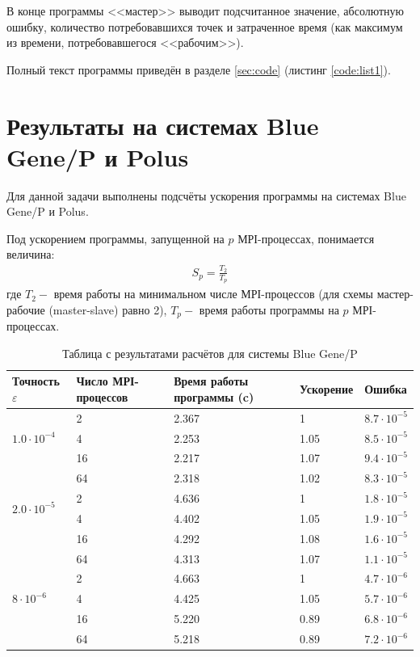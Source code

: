 \documentclass[12pt, fleqn]{article}
\theoremstyle{definition}
\begin{document}
В конце программы <<мастер>> выводит подсчитанное значение, абсолютную ошибку, количество  потребовавшихся точек и затраченное время (как максимум из времени, потребовавшегося <<рабочим>>).

Полный текст программы приведён в разделе \ref{sec:code} (листинг \ref{code:list1}).

\section{Результаты на системах Blue Gene/P и Polus}
Для данной задачи выполнены подсчёты ускорения программы на системах Blue Gene/P и Polus.

Под ускорением программы, запущенной на $p$ МРІ-процессах, понимается величина:
\abovedisplayskip=-1pt
\belowdisplayskip=-1pt
\noindent
\begin{gather*}
S_{p}=\frac{T_{2}}{T_{p}}
\end{gather*}
где $T_{2}-$ время работы на минимальном числе МРІ-процессов (для схемы мастер-рабочие (master-slave) равно 2), $T_{p}-$ время работы программы на $p$ МРІ-процессах.  

\begin{table}[ht!]
\begin{tabularx}{\linewidth}{|L|L|L|L|L|}
\hline Точность $\varepsilon$ & Число МРІ-процессов & Время работы программы (c) & Ускорение & Ошибка \\
\hline {} & 2 & 2.367 & 1 & $8.7 \cdot 10^{-5}$
\\
 & 4 & 2.253 & 1.05 &$8.5 \cdot 10^{-5}$\\
 & 16 & 2.217 & 1.07&$9.4 \cdot 10^{-5}$\\
 & 64 & 2.318& 1.02 & $8.3 \cdot 10^{-5}$\\
\hline {} & 2 & 4.636 & 1& $1.8 \cdot 10^{-5}$\\
 & 4 & 4.402 & 1.05& $1.9 \cdot 10^{-5}$\\
 & 16 & 4.292 & 1.08& $1.6 \cdot 10^{-5}$\\
 & 64 & 4.313& 1.07&$1.1 \cdot 10^{-5}$\\
\hline {} & 2 & 4.663 & 1& $4.7 \cdot 10^{-6}$\\
 & 4 & 4.425 & 1.05& $5.7 \cdot 10^{-6}$\\
 & 16 & 5.220& 0.89& $6.8 \cdot 10^{-6}$\\
 & 64 & 5.218& 0.89& $7.2 \cdot 10^{-6}$\\
\hline
\end{tabularx}
\caption{Таблица с результатами расчётов для системы Blue Gene/P}
\end{table}
\end{document}
